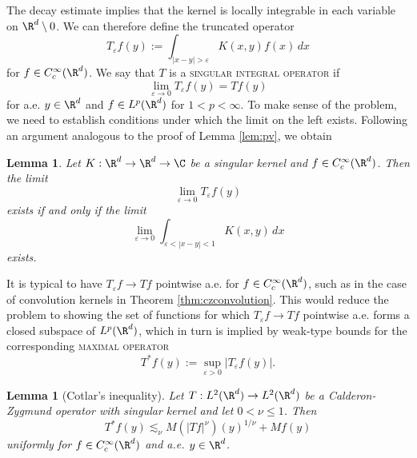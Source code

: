 \documentclass[reqno]{amsart}
\newtheorem{lemma}[theorem]{Lemma}
\theoremstyle{definition}
\theoremstyle{remark}
\renewcommand{\epsilon}{\varepsilon}
\renewcommand{\emph}{\textsc}
\begin{document}
The decay estimate implies that the kernel is locally integrable in each variable on $\R^d \setminus 0$. We can therefore define the truncated operator
	\[ T_\epsilon f(y) := \int_{|x - y| > \epsilon} K(x, y) f(x) \, dx \]
for $f \in C^\infty_c (\R^d)$. We say that $T$ is a \emph{singular integral operator} if 
	\[ \lim_{\epsilon \to 0} T_\epsilon f(y) = Tf(y) \]
for a.e. $y \in \R^d$ and $f \in L^p (\R^d)$ for $1 < p < \infty$. To make sense of the problem, we need to establish conditions under which the limit on the left exists. Following an argument analogous to the proof of Lemma \ref{lem:pv}, we obtain
\begin{lemma}
	Let $K : \R^d \to \R^d \to \C$ be a singular kernel and $f \in C^\infty_c (\R^d)$. Then the limit
		\[ \lim_{\epsilon \to 0} T_\epsilon f(y)\]
	exists if and only if the limit 	
		\[ \lim_{\epsilon \to 0} \int_{\epsilon < |x - y| < 1} K(x, y) \, dx \]	
	exists.	
\end{lemma}

It is typical to have $T_\epsilon f \to Tf$ pointwise a.e. for $f \in C^\infty_c (\R^d)$, such as in the case of convolution kernels in Theorem \ref{thm:czconvolution}. This would reduce the problem to showing the set of functions for which $T_\epsilon f \to Tf$ pointwise a.e. forms a closed subspace of $L^p (\R^d)$, which in turn is implied by weak-type bounds for the corresponding \emph{maximal operator}
	\[ T^* f(y) := \sup_{\epsilon > 0} |T_\epsilon f(y)|.\]	

\begin{lemma}[Cotlar's inequality]
	Let $T : L^2 (\R^d) \to L^2 (\R^d)$ be a Calderon-Zygmund operator with singular kernel and let $0 < \nu \leq 1$. Then 
		\[ T^* f(y) \lesssim_\nu M(|Tf|^\nu) (y)^{1/\nu} + Mf(y) \]
	uniformly for $f \in C^\infty_c (\R^d)$ and a.e. $y \in \R^d$. 
\end{lemma}
\end{document}
